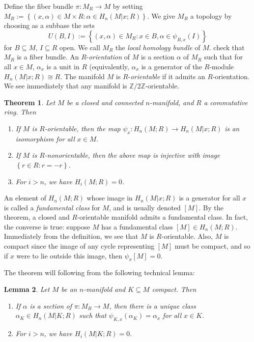 \documentclass{book}
\newcommand{\bbZ}{\mathbb{Z}}
\newcommand{\bbZmod}[1]{\bbZ/{#1}\bbZ}
\newcommand{\set}[1]{\left\{ {#1} \right\}}
\newtheorem{theorem}{Theorem}[section]
\newtheorem{lemma}[theorem]{Lemma}
\theoremstyle{definition}
\theoremstyle{remark}
\numberwithin{equation}{section}
\begin{document}
Define the fiber bundle $\pi \colon M_R \to M$ by setting $M_R := \set{ (x,\alpha) \in M \times R : \alpha \in H_n(M \vert x ; R) }$. We give $M_R$ a topology by choosing as a subbase the sets 
\begin{equation}
    U(B,I) := \set{ (x,\alpha) \in M_R : x \in B, \alpha \in \psi_{B,x}(I) }
\end{equation} 
for $B \subseteq M$, $I \subseteq R$ open. We call $M_R$ the \textit{local homology bundle} of $M$. {\color{red} check that $M_R$ is a fiber bundle.} An $R$-\textit{orientation} of $M$ is a section $\alpha$ of $M_R$ such that for all $x \in M$, $\alpha_x$ is a unit in $R$ (equivalently, $\alpha_x$ is a generator of the $R$-module $H_n(M \vert x ; R) \cong R$. The manifold $M$ is $R$-\textit{orientable} if it admits an $R$-orientation. We see immediately that any manifold is $\bbZmod{2}$-orientable.
\begin{theorem} \label{thm:HomoOfOrientableMfds}
    Let $M$ be a closed and connected $n$-manifold, and $R$ a commutative ring. Then
    \begin{enumerate}[label={\rm (\arabic*)}]
        \item If $M$ is $R$-orientable, then the map $\psi_x \colon H_n(M;R) \to H_n(M \vert x;R)$ is an isomorphism for all $x \in M$.
        \item If $M$ is $R$-nonorientable, then the above map is injective with image $\set{r \in R : r = -r}$.
        \item For $i > n$, we have $H_i(M;R) = 0$.
    \end{enumerate}
\end{theorem}
An element of $H_n(M;R)$ whose image in $H_n(M \vert x;R)$ is a generator for all $x$ is called a \textit{fundamental class} for $M$, and is usually denoted $[M]$. By the theorem, a closed and $R$-orientable manifold admits a fundamental class. In fact, the converse is true:
suppose $M$ has a fundamental class $[M] \in H_n(M;R)$. Immediately from the definition, we see that $M$ is $R$-orientable. Also, $M$ is compact since the image of any cycle representing $[M]$ must be compact, and so if $x$ were to lie outside this image, then $\psi_x[M] = 0$.

The theorem will following from the following technical lemma:
\begin{lemma}
    Let $M$ be an $n$-manifold and $K \subseteq M$ compact. Then
    \begin{enumerate}[label={\rm (\arabic*)}]
        \item If $\alpha$ is a section of $\pi \colon M_R \to M$, then there is a unique class $\alpha_K \in H_n(M \vert K;R)$ such that $\psi_{K,x}(\alpha_K) = \alpha_x$ for all $x \in K$.
        \item For $i > n$, we have $H_i(M \vert K;R) = 0$.
    \end{enumerate}
\end{lemma}
\end{document}
